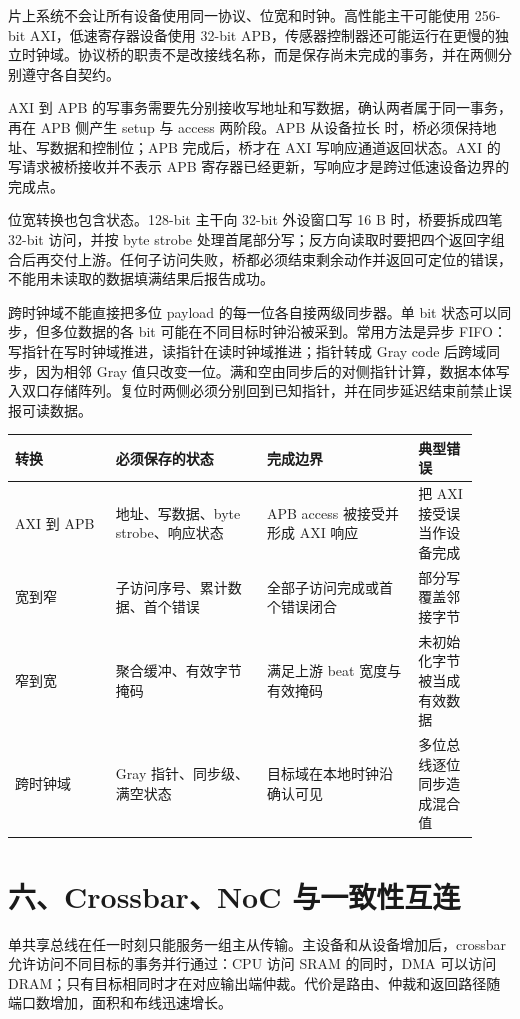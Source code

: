 片上系统不会让所有设备使用同一协议、位宽和时钟。高性能主干可能使用 256-bit AXI，低速寄存器设备使用 32-bit APB，传感器控制器还可能运行在更慢的独立时钟域。协议桥的职责不是改接线名称，而是保存尚未完成的事务，并在两侧分别遵守各自契约。

AXI 到 APB 的写事务需要先分别接收写地址和写数据，确认两者属于同一事务，再在 APB 侧产生 setup 与 access 两阶段。APB 从设备拉长  时，桥必须保持地址、写数据和控制位；APB 完成后，桥才在 AXI 写响应通道返回状态。AXI 的写请求被桥接收并不表示 APB 寄存器已经更新，写响应才是跨过低速设备边界的完成点。

位宽转换也包含状态。128-bit 主干向 32-bit 外设窗口写 16 B 时，桥要拆成四笔 32-bit 访问，并按 byte strobe 处理首尾部分写；反方向读取时要把四个返回字组合后再交付上游。任何子访问失败，桥都必须结束剩余动作并返回可定位的错误，不能用未读取的数据填满结果后报告成功。

跨时钟域不能直接把多位 payload 的每一位各自接两级同步器。单 bit 状态可以同步，但多位数据的各 bit 可能在不同目标时钟沿被采到。常用方法是异步 FIFO：写指针在写时钟域推进，读指针在读时钟域推进；指针转成 Gray code 后跨域同步，因为相邻 Gray 值只改变一位。满和空由同步后的对侧指针计算，数据本体写入双口存储阵列。复位时两侧必须分别回到已知指针，并在同步延迟结束前禁止误报可读数据。

\begin{longtable}{L{0.2\linewidth}L{0.30\linewidth}L{0.30\linewidth}L{0.12\linewidth}}
\toprule
转换 & 必须保存的状态 & 完成边界 & 典型错误 \\
\midrule
AXI 到 APB & 地址、写数据、byte strobe、响应状态 & APB access 被接受并形成 AXI 响应 & 把 AXI 接受误当作设备完成 \\\tablerowrule
宽到窄 & 子访问序号、累计数据、首个错误 & 全部子访问完成或首个错误闭合 & 部分写覆盖邻接字节 \\\tablerowrule
窄到宽 & 聚合缓冲、有效字节掩码 & 满足上游 beat 宽度与有效掩码 & 未初始化字节被当成有效数据 \\\tablerowrule
跨时钟域 & Gray 指针、同步级、满空状态 & 目标域在本地时钟沿确认可见 & 多位总线逐位同步造成混合值 \\
\bottomrule
\end{longtable}

\section{六、Crossbar、NoC 与一致性互连}

单共享总线在任一时刻只能服务一组主从传输。主设备和从设备增加后，crossbar 允许访问不同目标的事务并行通过：CPU 访问 SRAM 的同时，DMA 可以访问 DRAM；只有目标相同时才在对应输出端仲裁。代价是路由、仲裁和返回路径随端口数增加，面积和布线迅速增长。

